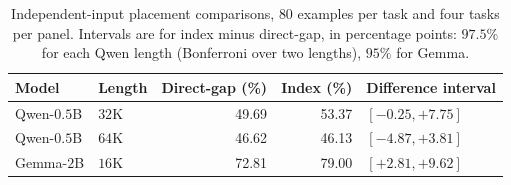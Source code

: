 \begin{table}[ht]
\centering\small
\caption{Independent-input placement comparisons, $80$ examples per task and four tasks per panel. Intervals are for index minus direct-gap, in percentage points: $97.5\%$ for each Qwen length (Bonferroni over two lengths), $95\%$ for Gemma.}
\label{tab:coordinate-confirmation}
\begin{tabular}{@{}llrrl@{}}
\toprule
Model & Length & Direct-gap (\%) & Index (\%) & Difference interval\\
\midrule
Qwen-$0.5$B & $32$K & 49.69 & 53.37 & $[-0.25,+7.75]$ \\
Qwen-$0.5$B & $64$K & 46.62 & 46.13 & $[-4.87,+3.81]$ \\
Gemma-$2$B & $16$K & 72.81 & 79.00 & $[+2.81,+9.62]$ \\
\bottomrule
\end{tabular}
\end{table}
